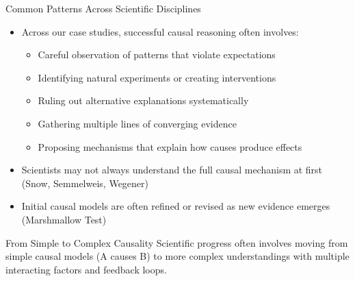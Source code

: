 \documentclass{beamer}
\begin{document}
\begin{frame}{Common Patterns Across Scientific Disciplines}
    \begin{itemize}
        \item Across our case studies, successful causal reasoning often involves:
            \begin{itemize}
                \item Careful observation of patterns that violate expectations
                \item Identifying natural experiments or creating interventions
                \item Ruling out alternative explanations systematically
                \item Gathering multiple lines of converging evidence
                \item Proposing mechanisms that explain how causes produce effects
            \end{itemize}
        \item Scientists may not always understand the full causal mechanism at first (Snow, Semmelweis, Wegener)
        \item Initial causal models are often refined or revised as new evidence emerges (Marshmallow Test)
    \end{itemize}
    
    \begin{block}{From Simple to Complex Causality}
        Scientific progress often involves moving from simple causal models (A causes B) to more complex understandings with multiple interacting factors and feedback loops.
    \end{block}
\end{frame}
\end{document}
